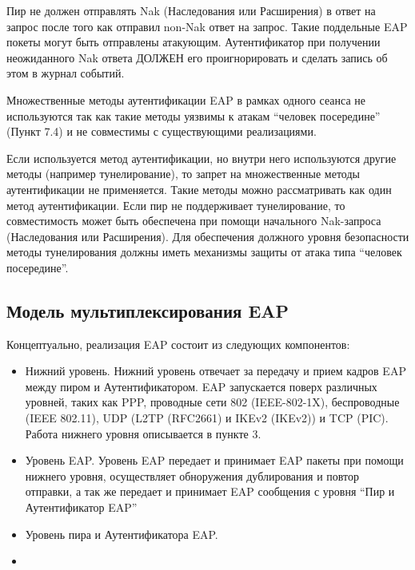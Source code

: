 Пир не должен отправлять Nak (Наследования или Расширения) в ответ на запрос после того как отправил non-Nak ответ на запрос. Такие поддельные EAP покеты могут быть отправлены атакующим. Аутентификатор при получении неожиданного Nak ответа ДОЛЖЕН его проигнорировать и сделать запись об этом в журнал событий.

Множественные методы аутентификации EAP в рамках одного сеанса не используются так как такие методы уязвимы к атакам ``человек посередине'' (Пункт 7.4) и не совместимы с существующими реализациями.

Если используется метод аутентификации, но внутри него используются другие методы (например тунелирование), то запрет на множественные методы аутентификации не применяется. Такие методы можно рассматривать как один метод аутентификации. Если пир не поддерживает тунелирование, то совместимость может быть обеспечена при помощи начального Nak-запроса (Наследования или Расширения). Для обеспечения должного уровня безопасности методы тунелирования должны иметь механизмы защиты от атака типа ``человек посередине''.

\subsection{Модель мультиплексирования EAP}

Концептуально, реализация EAP состоит из следующих компонентов:

\begin{itemize}
\item Нижний уровень. Нижний уровень отвечает за передачу и прием кадров EAP между пиром и Аутентификатором. EAP запускается поверх различных уровней, таких как PPP, проводные сети 802 (IEEE-802-1X), беспроводные (IEEE 802.11), UDP (L2TP (RFC2661) и IKEv2 (IKEv2)) и TCP (PIC). Работа нижнего уровня описывается в пункте 3.
\item Уровень EAP. Уровень EAP передает и принимает EAP пакеты при помощи нижнего уровня, осуществляет обноружения дублирования и повтор отправки, а так же передает и принимает EAP сообщения с уровня ``Пир и Аутентификатор EAP''
\item Уровень пира и Аутентификатора EAP. 
\item
\end{itemize}
